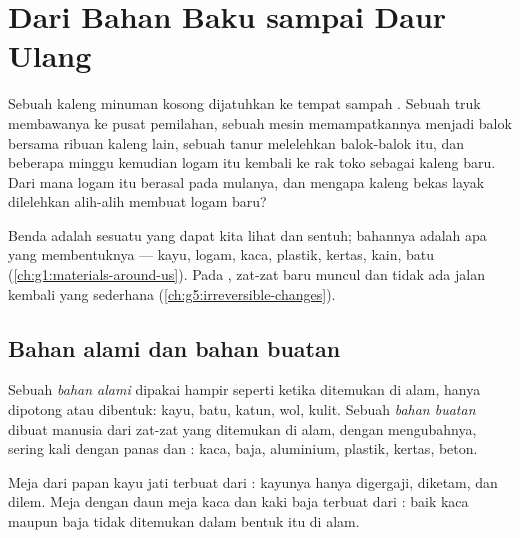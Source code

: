 \chapter{Dari Bahan Baku sampai Daur Ulang}\label{ch:g5:raw-materials-and-recycling}

Sebuah kaleng minuman kosong dijatuhkan ke tempat sampah .
Sebuah truk membawanya ke pusat pemilahan, sebuah mesin memampatkannya
menjadi balok bersama ribuan kaleng lain, sebuah tanur melelehkan
balok-balok itu, dan beberapa minggu kemudian logam itu kembali ke rak
toko sebagai kaleng baru. Dari mana logam itu berasal pada mulanya, dan
mengapa kaleng bekas layak dilelehkan alih-alih membuat logam baru?

\begin{recall}
Benda adalah sesuatu yang dapat kita lihat dan sentuh; bahannya adalah
apa yang membentuknya --- kayu, logam, kaca, plastik, kertas, kain, batu
(\cref{ch:g1:materials-around-us}). Pada , zat-zat baru
muncul dan tidak ada jalan kembali yang sederhana
(\cref{ch:g5:irreversible-changes}).
\end{recall}

\section{Bahan alami dan bahan buatan}

\begin{definition}\label{def:g5:raw-materials-and-recycling:natural-material}
Sebuah \emph{bahan alami} dipakai hampir seperti
ketika ditemukan di alam, hanya dipotong atau dibentuk: kayu, batu,
katun, wol, kulit. Sebuah \emph{bahan buatan}
dibuat manusia dari zat-zat yang ditemukan di alam, dengan mengubahnya,
sering kali dengan panas dan : kaca, baja, aluminium,
plastik, kertas, beton.
\end{definition}

\begin{example}\label{ex:g5:raw-materials-and-recycling:tables}
Meja dari papan kayu jati terbuat dari : kayunya hanya
digergaji, diketam, dan dilem. Meja dengan daun meja kaca dan kaki baja
terbuat dari : baik kaca maupun baja tidak ditemukan dalam
bentuk itu di alam.
\end{example}


